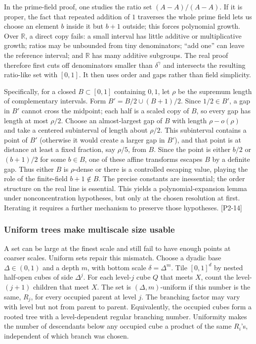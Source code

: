 In the prime-field proof, one studies the ratio set \((A-A)/(A-A)\). If it is proper, the fact that repeated addition of \(1\) traverses the whole prime field lets us choose an element \(b\) inside it but \(b+1\) outside; this forces polynomial growth. Over \(\mathbb R\), a direct copy fails: a small interval has little additive or multiplicative growth; ratios may be unbounded from tiny denominators; ``add one'' can leave the reference interval; and \(\mathbb R\) has many additive subgroups. The real proof therefore first cuts off denominators smaller than \(\delta^\gamma\) and intersects the resulting ratio-like set with \([0,1]\). It then uses order and gaps rather than field simplicity.

Specifically, for a closed \(B\subset[0,1]\) containing \(0,1\), let \(\rho\) be the supremum length of complementary intervals. Form \(B'=B/2\cup(B+1)/2\). Since \(1/2\in B'\), a gap in \(B'\) cannot cross the midpoint; each half is a scaled copy of \(B\), so every gap has length at most \(\rho/2\). Choose an almost-largest gap of \(B\) with length \(\rho-o(\rho)\) and take a centered subinterval of length about \(\rho/2\). This subinterval contains a point of \(B'\) (otherwise it would create a larger gap in \(B'\)), and that point is at distance at least a fixed fraction, say \(\rho/5\), from \(B\). Since the point is either \(b/2\) or \((b+1)/2\) for some \(b\in B\), one of these affine transforms escapes \(B\) by a definite gap. Thus either \(B\) is \(\rho\)-dense or there is a controlled escaping value, playing the role of the finite-field \(b+1\notin B\). The precise constants are inessential; the order structure on the real line is essential. This yields a polynomial-expansion lemma under nonconcentration hypotheses, but only at the chosen resolution at first. Iterating it requires a further mechanism to preserve those hypotheses. {[}P2-14{]}

\subsubsection{Uniform trees make multiscale size usable}\label{04-visual-computing-ii-ch033-uniform-trees-make-multiscale-size-usable-1}

A set can be large at the finest scale and still fail to have enough points at coarser scales. Uniform sets repair this mismatch. Choose a dyadic base \(\Delta\in(0,1)\) and a depth \(m\), with bottom scale \(\delta=\Delta^m\). Tile \([0,1]^d\) by nested half-open cubes of side \(\Delta^j\). For each level-\(j\) cube \(Q\) that meets \(X\), count the level-\((j+1)\) children that meet \(X\). The set is \((\Delta,m)\)-uniform if this number is the same, \(R_j\), for every occupied parent at level \(j\). The branching factor may vary with level but not from parent to parent. Equivalently, the occupied cubes form a rooted tree with a level-dependent regular branching number. Uniformity makes the number of descendants below any occupied cube a product of the same \(R_i\)'s, independent of which branch was chosen.

